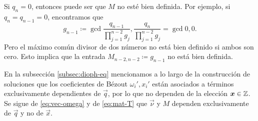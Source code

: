 \begin{observation}
	Si $q_n = 0$, entonces puede ser que $M$ no esté bien definida. Por ejemplo, si
	$q_n = q_{n-1} = 0$, encontramos que
	\begin{equation*}
		g_{n-1} \coloneq \gcd{\frac{q_{n-1}}{\prod_{j=1}^{n-2}g_j},
		\frac{q_n}{\prod_{j=1}^{n-2}g_j}} = \gcd{0, 0}.
	\end{equation*}
	Pero el máximo común divisor de dos números no está bien definido si ambos
	son cero. Esto implica que la entrada $M_{n-2, n-2} \coloneq g_{n-1}$ no
	está bien definida.
\end{observation}

En la subsección \ref{subsec:dioph-eq} mencionamos a lo largo de la construcción de soluciones que
los coeficientes de Bézout $\omega_i', x_i'$ están asociados a términos exclusivamente dependientes
de $\vec{q}$, por lo que no dependen de la elección $\boldsymbol{x} \in \mathbb{Z}$. Se sigue de
\eqref{eq:vec-omega} y de \eqref{eq:mat-T} que $\vec{\nu}$ y $M$ dependen exclusivamente de
$\vec{q}$ y no de $\vec{x}$.

